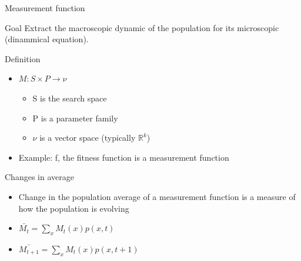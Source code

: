 \begin{frame}{Measurement function}
  \begin{block}{Goal}
    Extract the macroscopic dynamic of the population for its microscopic (dinammical equation).
  \end{block}

  \begin{block}{Definition}
    \begin{itemize}
    \item$M: S \times P \longrightarrow \nu$
      \begin{itemize}
        \item S is the search space
        \item P is a parameter family
        \item $\nu$ is a vector space (typically $\mathbb{R}^k$)
      \end{itemize}
    \item Example: f, the fitness function is a measurement function
    \end{itemize}
  \end{block}

  \begin{block}{Changes in average}
    \begin{itemize}
    \item Change in the population average of a measurement function is a measure of how the population is evolving
    \item $\bar{M_t} = \sum\limits_{x} M_t(x)p(x,t)$
    \item $\bar{M_{t+1}} = \sum\limits_{x} M_t(x)p(x,t+1)$
    \end{itemize}
  \end{block}
\end{frame}

